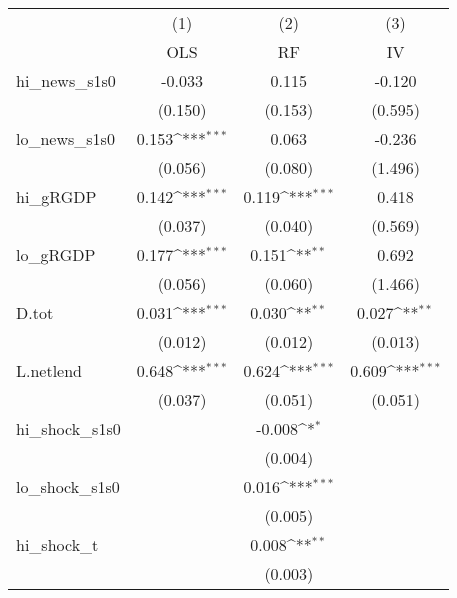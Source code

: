 {
\def\sym#1{\ifmmode^{#1}\else\(^{#1}\)\fi}
\begin{tabular}{l*{3}{c}}
\toprule
            &\multicolumn{1}{c}{(1)}&\multicolumn{1}{c}{(2)}&\multicolumn{1}{c}{(3)}\\
            &\multicolumn{1}{c}{OLS}&\multicolumn{1}{c}{RF}&\multicolumn{1}{c}{IV}\\
\midrule
hi\_news\_s1s0&      -0.033         &       0.115         &      -0.120         \\
            &     (0.150)         &     (0.153)         &     (0.595)         \\
\addlinespace
lo\_news\_s1s0&       0.153\sym{***}&       0.063         &      -0.236         \\
            &     (0.056)         &     (0.080)         &     (1.496)         \\
\addlinespace
hi\_gRGDP    &       0.142\sym{***}&       0.119\sym{***}&       0.418         \\
            &     (0.037)         &     (0.040)         &     (0.569)         \\
\addlinespace
lo\_gRGDP    &       0.177\sym{***}&       0.151\sym{**} &       0.692         \\
            &     (0.056)         &     (0.060)         &     (1.466)         \\
\addlinespace
D.tot       &       0.031\sym{***}&       0.030\sym{**} &       0.027\sym{**} \\
            &     (0.012)         &     (0.012)         &     (0.013)         \\
\addlinespace
L.netlend   &       0.648\sym{***}&       0.624\sym{***}&       0.609\sym{***}\\
            &     (0.037)         &     (0.051)         &     (0.051)         \\
\addlinespace
hi\_shock\_s1s0&                     &      -0.008\sym{*}  &                     \\
            &                     &     (0.004)         &                     \\
\addlinespace
lo\_shock\_s1s0&                     &       0.016\sym{***}&                     \\
            &                     &     (0.005)         &                     \\
\addlinespace
hi\_shock\_t  &                     &       0.008\sym{**} &                     \\
            &                     &     (0.003)         &                     \\

\end{tabular}}
